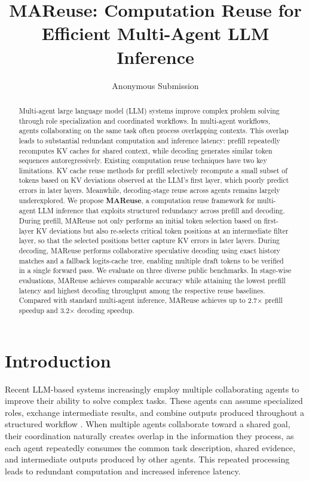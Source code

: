 \documentclass[letterpaper]{article} %
\title{MAReuse: Computation Reuse for Efficient Multi-Agent LLM Inference}
\author{Anonymous Submission}
\begin{document}
\maketitle

\begin{abstract}
Multi-agent large language model (LLM) systems improve complex problem solving through role specialization and coordinated workflows. In multi-agent workflows, agents collaborating on the same task often process overlapping contexts. This overlap leads to substantial redundant computation and inference latency: prefill repeatedly recomputes KV caches for shared context, while decoding generates similar token sequences autoregressively. Existing computation reuse techniques have two key limitations. KV cache reuse methods for prefill selectively recompute a small subset of tokens based on KV deviations observed at the LLM's first layer, which poorly predict errors in later layers. Meanwhile, decoding-stage reuse across agents remains largely underexplored. We propose \textbf{MAReuse}, a computation reuse framework for multi-agent LLM inference that exploits structured redundancy across prefill and decoding. During prefill, MAReuse not only performs an initial token selection based on first-layer KV deviations but also re-selects critical token positions at an intermediate filter layer, so that the selected positions better capture KV errors in later layers. During decoding, MAReuse performs collaborative speculative decoding using exact history matches and a fallback logits-cache tree, enabling multiple draft tokens to be verified in a single forward pass. We evaluate on three diverse public benchmarks. In stage-wise evaluations, MAReuse achieves comparable accuracy while attaining the lowest prefill latency and highest decoding throughput among the respective reuse baselines. Compared with standard multi-agent inference, MAReuse achieves up to 2.7$\times$ prefill speedup and 3.2$\times$ decoding speedup.
\end{abstract}

\section{Introduction}

Recent LLM-based systems increasingly employ multiple collaborating agents to improve their ability to solve complex tasks. These agents can assume specialized roles, exchange intermediate results, and combine outputs produced throughout a structured workflow \citep{DBLP:conf/nips/LiHIKG23, DBLP:conf/iclr/ZhangYLYWWCY025}. When multiple agents collaborate toward a shared goal, their coordination naturally creates overlap in the information they process, as each agent repeatedly consumes the common task description, shared evidence, and intermediate outputs produced by other agents. This repeated processing leads to redundant computation and increased inference latency.
\end{document}
